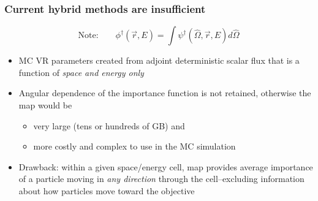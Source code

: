 \documentclass[xcolor=x11names,compress]{beamer}
\renewcommand{\(}{\begin{columns}}
\renewcommand{\)}{\end{columns}}
\newcommand{\<}[1]{\begin{column}{#1}}
\renewcommand{\>}{\end{column}}
\newcommand{\vOmega}{\ensuremath{\hat{\Omega}}}
\newcommand{\ve}[1]{\ensuremath{\vec{#1}}}
\begin{document}
%


\begin{frame}[fragile]
  \frametitle{Current hybrid methods are insufficient}

\[\text{Note:}\qquad\phi^{\dagger}(\ve{r},E) = \int \psi^{\dagger}(\vOmega, 
		\ve{r},E) d\vOmega\]

	\begin{itemize}
	\item MC VR parameters created from adjoint deterministic scalar flux that is a function of \textit{space and energy only} \vspace*{1 em}
	\pause
	\item Angular dependence of the importance function is not retained, otherwise the map would be 
	\begin{itemize}
	  \item very large (tens or hundreds of GB) and
	  \item more costly and complex to use in the MC simulation 
	\end{itemize}
	\pause
	\item Drawback: within a given space/energy cell, map provides average importance of a particle moving in \textit{any direction} through the cell--excluding information about how particles move \alert{toward the objective}
	\end{itemize}

\end{frame}
\end{document}
